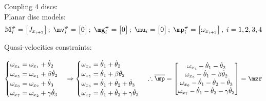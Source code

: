 \documentclass[a4paper,11pt,brazil,fleqn]{article}
\begin{document}
Coupling 4 discs: \\

Planar disc models: 
\begin{equation}
\mM\ssh_i = \begin{bmatrix} J_{x_{i+3}} \end{bmatrix}; \; \mv\ssh_i = \begin{bmatrix} 0 \end{bmatrix}; \; \mg\ssh_i = \begin{bmatrix} 0 \end{bmatrix}; \; \mu_i = \begin{bmatrix} 0 \end{bmatrix}; \; \mp\ssh_i = \begin{bmatrix} \omega_{x_{i+3}} \end{bmatrix}, \; i = 1, 2, 3, 4
\end{equation}

Quasi-velocities constraints:

\begin{equation}
\begin{cases}
\omega_{x_4} = \omega_{x_1} + \dot{\theta}_2 \\
\omega_{x_5} = \omega_{x_1} + \beta\dot{\theta}_2 \\
\omega_{x_6} = \omega_{x_2} + \dot{\theta}_3 \\
\omega_{x_7} = \omega_{x_2} + \gamma\dot{\theta}_3 \\
\end{cases}
\Rightarrow
\begin{cases}
\omega_{x_4} = \dot{\theta}_1 + \dot{\theta}_2 \\
\omega_{x_5} = \dot{\theta}_1 + \beta\dot{\theta}_2 \\
\omega_{x_6} = \dot{\theta}_1 + \dot{\theta}_2 + \dot{\theta}_3 \\
\omega_{x_7} = \dot{\theta}_1 + \dot{\theta}_2 + \gamma\dot{\theta}_3 \\
\end{cases}
\therefore
\overline{\mp} = 
\begin{bmatrix}
\omega_{x_4} - \dot{\theta}_1 - \dot{\theta}_2 \\
\omega_{x_5} - \dot{\theta}_1 - \beta\dot{\theta}_2 \\
\omega_{x_6} - \dot{\theta}_1 - \dot{\theta}_2 - \dot{\theta}_3 \\
\omega_{x_7} - \dot{\theta}_1 - \dot{\theta}_2 - \gamma\dot{\theta}_3 \\
\end{bmatrix}
=\mzr
\end{equation}
\end{document}
